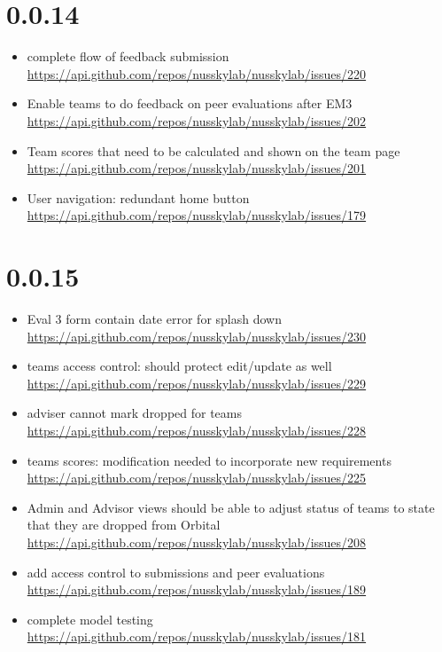 {\section{0.0.14}
\begin{itemize}[noitemsep]
    \item complete flow of feedback submission \url{https://api.github.com/repos/nusskylab/nusskylab/issues/220} 
    \item Enable teams to do feedback on peer evaluations after EM3 \url{https://api.github.com/repos/nusskylab/nusskylab/issues/202} 
    \item Team scores that need to be calculated and shown on the team page \url{https://api.github.com/repos/nusskylab/nusskylab/issues/201} 
    \item User navigation: redundant home button \url{https://api.github.com/repos/nusskylab/nusskylab/issues/179} 
\end{itemize}

\section{0.0.15}
\begin{itemize}[noitemsep]
    \item Eval 3 form contain date error for splash down \url{https://api.github.com/repos/nusskylab/nusskylab/issues/230} 
    \item teams access control: should protect edit/update as well \url{https://api.github.com/repos/nusskylab/nusskylab/issues/229} 
    \item adviser cannot mark dropped for teams \url{https://api.github.com/repos/nusskylab/nusskylab/issues/228} 
    \item teams scores: modification needed to incorporate new requirements  \url{https://api.github.com/repos/nusskylab/nusskylab/issues/225} 
    \item Admin and Advisor views should be able to adjust status of teams to state that they are dropped from Orbital  \url{https://api.github.com/repos/nusskylab/nusskylab/issues/208} 
    \item add access control to submissions and peer evaluations \url{https://api.github.com/repos/nusskylab/nusskylab/issues/189} 
    \item complete model testing \url{https://api.github.com/repos/nusskylab/nusskylab/issues/181} 
\end{itemize}

}
